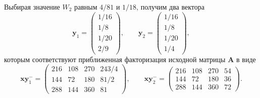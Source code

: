 \documentclass[specialist,
               substylefile = spbu.rtx,
               subf,href,colorlinks=true, 12pt]{disser}
\theoremstyle{definition}
\begin{document}
Выбирая значение $W_{2}$ равным $4/81$ и $1/18$, получим два вектора
\begin{equation*}
\bm{y}_{1}
=
\begin{pmatrix}
 1/16
\\
 1/8
\\
 1/20
\\
 2/9
\end{pmatrix},
\qquad
\bm{y}_{2}
=
\begin{pmatrix}
 1/16
\\
 1/8
\\
 1/20
\\
 1/4
\end{pmatrix},
\end{equation*}
которым соответствуют приближенная факторизация исходной матрицы $\bm{A}$ в виде
\begin{equation*}
\bm{x}\bm{y}_{1}^{-}
=
\begin{pmatrix}
 216 & 108 & 270 & 243/4
\\
 144 & 72 & 180 & 81/2
\\
 288 & 144 & 360 & 81
\end{pmatrix},
\qquad
\bm{x}\bm{y}_{2}^{-}
=
\begin{pmatrix}
 216 & 108 & 270 & 54
\\
 144 & 72 & 180 & 36
\\
 288 & 144 & 360 & 72
\end{pmatrix}.
\end{equation*}




%
\end{document}
